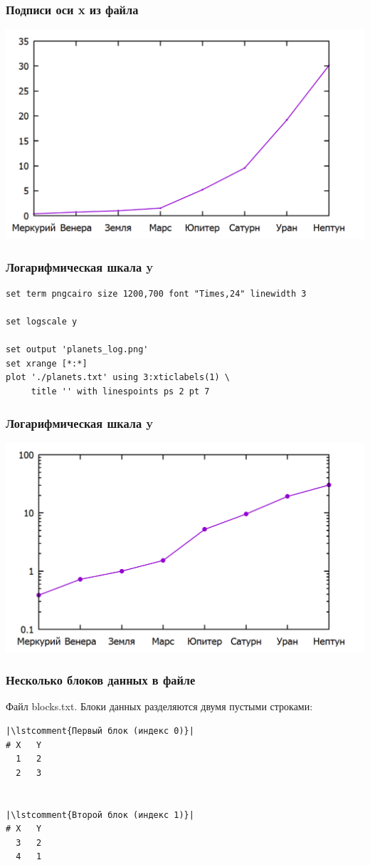 \documentclass[12pt, compress]{beamer}
\newcommand{\lstcomment}[1]{\textcolor{dark-green}{\# \texttt{#1}}}
\begin{document}
\begin{frame}[t,fragile]
\frametitle{Подписи оси x из файла}
\includegraphics[width=1\textwidth]{./gp/planets.png}
\end{frame}

\begin{frame}[c,fragile]
\frametitle{Логарифмическая шкала y}
\begin{lstlisting}
set term pngcairo size 1200,700 font "Times,24" linewidth 3

set logscale y

set output 'planets_log.png'
set xrange [*:*]
plot './planets.txt' using 3:xticlabels(1) \
     title '' with linespoints ps 2 pt 7
\end{lstlisting}
\end{frame}

\begin{frame}[t,fragile]
\frametitle{Логарифмическая шкала y}
\includegraphics[width=1\textwidth]{./gp/planets_log.png}
\end{frame}


\begin{frame}[c,fragile]
\frametitle{Несколько блоков данных в файле}
Файл blocks.txt. Блоки данных разделяются двумя пустыми строками:
\begin{lstlisting}
|\lstcomment{Первый блок (индекс 0)}|
# X   Y
  1   2
  2   3


|\lstcomment{Второй блок (индекс 1)}|
# X   Y
  3   2
  4   1
\end{lstlisting}  
\end{frame}
\end{document}
